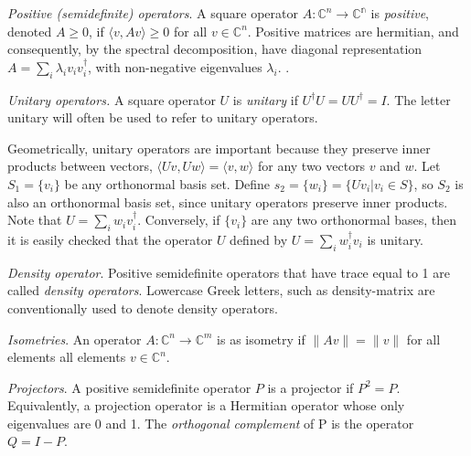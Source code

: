 \begin{definition} \label{def:positive}
  \emph{Positive (semidefinite) operators}. A square operator $A:\mathbb{C}^{n} \rightarrow \mathbb{C^{n}}$ is \emph{positive}, denoted $A \geq 0$, if $\langle v, Av \rangle \geq 0$ for all $v \in \mathbb{C}^{n}$. Positive matrices are hermitian, and consequently, by the spectral decomposition, have diagonal representation $A =  \sum_i \lambda_i v_i v_i^{\dag}$, with non-negative eigenvalues $\lambda_i$. \cite{nielsen2010quantum}.
\end{definition}

\begin{definition}
  \emph{Unitary operators.} A square operator $U$ is \emph{unitary} if $U^{\dagger}U = UU^{\dagger} = I$. The letter \gls{unitary} will often be used to refer to unitary
  operators.
\end{definition}
Geometrically, unitary operators are important because they preserve inner products between vectors, $\langle U v, U w \rangle = \langle v, w \rangle$  for any two vectors $v$ and $w$. Let $S_1=\{v_i\}$ be any orthonormal basis set. Define $ s_2= \{w_i\} = \{U v_i | v_i \in S \}$, so $S_2$ is also an orthonormal basis set, since unitary operators preserve inner products. Note that $U = \sum_{i} w_i v_i^{\dag}$. Conversely, if $\{v_i\}$ are any two orthonormal bases, then it is easily checked that
the operator $U$ defined by $U = \sum_{i} w_i^{\dag} v_i$ is unitary.

\begin{definition}
  \emph{Density operator}. Positive semidefinite operators that have trace equal to 1 are called \emph{density operators}. Lowercase Greek letters, such as \gls{density-matrix} are conventionally used to denote density operators.
\end{definition}

\begin{definition}
  \emph{Isometries}. An operator $A: \mathbb{C}^{n} \rightarrow \mathbb{C}^{m}$ is as isometry if $\|Av\| = \|v\|$ for all elements all elements $v \in \mathbb{C}^{n} $.
\end{definition}

\begin{definition}
  \emph{Projectors}. A positive semidefinite operator $P$ is a projector if $P^2 = P$. Equivalently, a projection operator is a Hermitian operator whose only eigenvalues are 0 and 1. The \emph{orthogonal complement} of P is the operator $Q = I − P$.
\end{definition}

